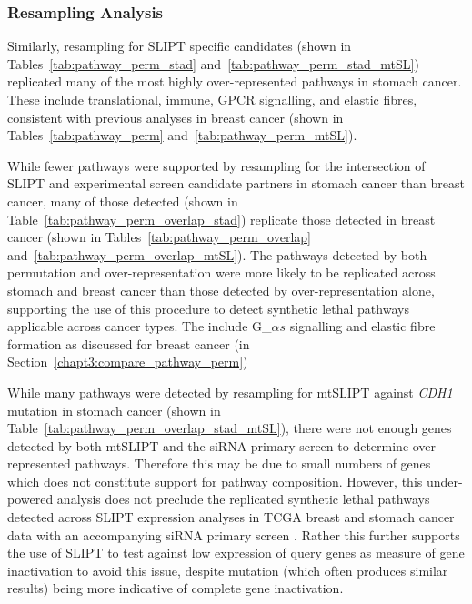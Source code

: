 \FloatBarrier

\subsubsection{Resampling Analysis}  \label{chapt3:compare_pathway_perm_stad_SL}

Similarly, resampling for \gls{SLIPT} specific candidates (shown in Tables~\ref{tab:pathway_perm_stad} and~\ref{tab:pathway_perm_stad_mtSL}) replicated many of the most highly over-represented pathways in stomach cancer. These include translational, immune, GPCR signalling, and elastic fibres, consistent with previous analyses in breast cancer (shown in Tables~\ref{tab:pathway_perm} and~\ref{tab:pathway_perm_mtSL}).

While fewer pathways were supported by resampling for the intersection of \gls{SLIPT} and experimental screen \citep{Telford2015} candidate partners in stomach cancer than breast cancer, many of those detected (shown in Table~\ref{tab:pathway_perm_overlap_stad}) replicate those detected in breast cancer (shown in Tables~\ref{tab:pathway_perm_overlap} and~\ref{tab:pathway_perm_overlap_mtSL}). The pathways detected by both permutation and over-representation were more likely to be replicated across stomach and breast cancer than those detected by over-representation alone, supporting the use of this procedure to detect synthetic lethal pathways applicable across cancer types. The include G_${\alpha s}$ signalling and elastic fibre formation as discussed for breast cancer (in Section~\ref{chapt3:compare_pathway_perm})

While many pathways were detected by resampling for mtSLIPT against \textit{CDH1} mutation in stomach cancer (shown in Table~\ref{tab:pathway_perm_overlap_stad_mtSL}), there were not enough genes detected by both mtSLIPT and the siRNA primary screen to determine over-represented pathways. Therefore this may be due to small numbers of genes which does not constitute support for pathway composition. However, this under-powered analysis does not preclude the replicated synthetic lethal pathways detected across \gls{SLIPT} expression analyses in TCGA breast and stomach cancer data with an accompanying siRNA primary screen \citep{Telford2015}. Rather this further supports the use of \gls{SLIPT} to test against low expression of query genes as measure of gene inactivation to avoid this issue, despite mutation (which often produces similar results) being more indicative of complete gene inactivation.

